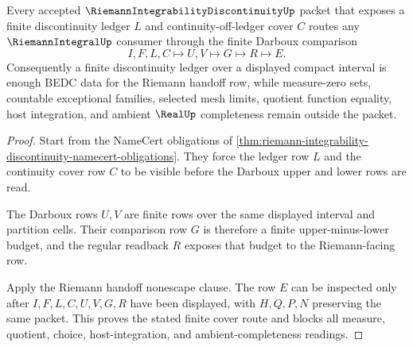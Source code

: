 \begin{theorem}
\label{thm:riemann-integrability-finite-discontinuity-cover}
Every accepted $\RiemannIntegrabilityDiscontinuityUp$ packet that exposes a finite discontinuity ledger $L$ and continuity-off-ledger cover $C$ routes any $\RiemannIntegralUp$ consumer through the finite Darboux comparison
$$
I,F,L,C \longmapsto U,V \longmapsto G \longmapsto R \longmapsto E .
$$
Consequently a finite discontinuity ledger over a displayed compact interval is enough BEDC data for the Riemann handoff row, while measure-zero sets, countable exceptional families, selected mesh limits, quotient function equality, host integration, and ambient $\RealUp$ completeness remain outside the packet.
\end{theorem}
\begin{proof}
Start from the NameCert obligations of \autoref{thm:riemann-integrability-discontinuity-namecert-obligations}. They force the ledger row $L$ and the continuity cover row $C$ to be visible before the Darboux upper and lower rows are read.

The Darboux rows $U,V$ are finite rows over the same displayed interval and partition cells. Their comparison row $G$ is therefore a finite upper-minus-lower budget, and the regular readback $R$ exposes that budget to the Riemann-facing row.

Apply the Riemann handoff nonescape clause. The row $E$ can be inspected only after $I,F,L,C,U,V,G,R$ have been displayed, with $H,Q,P,N$ preserving the same packet. This proves the stated finite cover route and blocks all measure, quotient, choice, host-integration, and ambient-completeness readings.
\end{proof}



